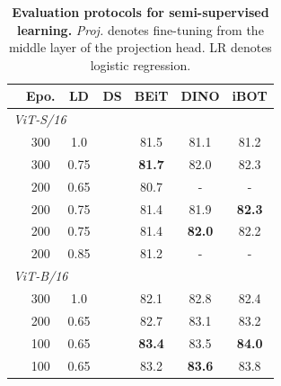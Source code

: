 \documentclass{article} %
\newcommand{\cmark}{\ding{51}}%
\newcommand{\xmark}{\ding{55}}%
\newcounter{rownumbers}
\newcommand\rownumber{\stepcounter{rownumbers}\arabic{rownumbers}}
\def\ourmethod{{iBOT}\xspace}
\begin{document}
\begin{table}[htb]
\begin{minipage}[c]{.55\linewidth}
\captionsetup{width=.95\linewidth}
\caption{\textbf{Different fine-tuning recipes.} LD denotes layerwise learning rate decay. DS denotes mixed-precision training with DeepSpeed.}
\label{tab:recipe}
\vspace{0.07cm}
\centering
\setcounter{rownumbers}{0}
\begin{tabular}{lcccccc}
& Epo. & LD & DS & BEiT & DINO & \ourmethod \\
\toprule
\multicolumn{7}{l}{\textit{ViT-S/16}} \\
\textcolor{orange}{\rownumber} & 300 & 1.0 & \xmark & 81.5 & 81.1 & 81.2 \\
\textcolor{orange}{\rownumber} & 300 & 0.75 & \cmark & \bf 81.7 & 82.0 & 82.3 \\ 
\textcolor{orange}{\rownumber} & 200 & 0.65 & \xmark & 80.7 & - & - \\ 
\textcolor{orange}{\rownumber} & 200 & 0.75 & \xmark & 81.4 & 81.9 & \bf 82.3 \\ 
\textcolor{orange}{\rownumber} & 200 & 0.75 & \cmark & 81.4 & \bf 82.0 & 82.2 \\ 
\textcolor{orange}{\rownumber} & 200 & 0.85 & \xmark & 81.2 & - & - \\ 
\midrule
\multicolumn{7}{l}{\textit{ViT-B/16}} \\
\textcolor{orange}{\rownumber} & 300 & 1.0 & \xmark &  82.1 & 82.8 & 82.4 \\
\textcolor{orange}{\rownumber} & 200 & 0.65 & \cmark & 82.7 & 83.1 & 83.2 \\
\textcolor{orange}{\rownumber} & 100 & 0.65 & \xmark & \bf 83.4 & 83.5 & \bf 84.0 \\
\textcolor{orange}{\rownumber} & 100 & 0.65 & \cmark & 83.2 & \bf 83.6 & 83.8 \\
\bottomrule
\end{tabular}%
\end{minipage}%
\hspace{0.1cm}
\begin{minipage}[r]{.45\linewidth}
\captionsetup{width=.95\linewidth}
\caption{\textbf{Evaluation protocols for semi-supervised learning.} \textit{Proj.} denotes fine-tuning from the middle layer of the projection head. LR denotes logistic regression.}
\label{tab:xxx}
\vspace{-0.07cm}
\centering
\setcounter{rownumbers}{0}
\setlength{\tabcolsep}{1.6mm}{
\scalebox{0.96}{
}}
\end{minipage}
\end{table}
\end{document}
